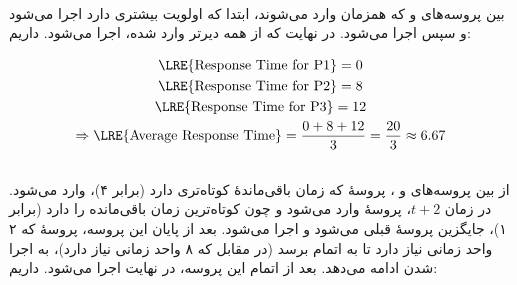 \documentclass{article}
\begin{document}
	\paragraph*{}
	بین پروسه‌های
	و
	که همزمان وارد می‌شوند، ابتدا
	که اولویت بیشتری دارد اجرا می‌شود و سپس
	اجرا می‌شود. در نهایت
	که از همه دیرتر وارد شده، اجرا می‌شود. داریم:

	\begin{gather*}
		\textrm{\LRE{Response Time for P1}} = 0 \\
		\textrm{\LRE{Response Time for P2}} = 8 \\
		\textrm{\LRE{Response Time for P3}} = 12 \\
		\Rightarrow
		\textrm{\LRE{Average Response Time}} =
		\frac{0 + 8 + 12}{3} = \frac{20}{3} \approx 6.67
	\end{gather*}

	\subsection*{}

	\begin{latin}
	\end{latin}

	\paragraph*{}
	از بین پروسه‌های
	و
	،
	پروسهٔ
	که زمان باقی‌مانده‌ٔ کوتاه‌تری دارد (برابر ۴)، وارد می‌شود. در زمان
	$t + 2$،
	پروسهٔ
	وارد می‌شود و چون کوتاه‌ترین زمان باقی‌مانده را دارد (برابر ۱)، جایگزین پروسهٔ قبلی می‌شود و اجرا می‌شود. بعد از پایان این پروسه، پروسهٔ
	که ۲ واحد زمانی نیاز دارد تا به اتمام برسد (در مقابل
	که ۸ واحد زمانی نیاز دارد)، به اجرا شدن ادامه می‌دهد. بعد از اتمام این پروسه،
	در نهایت اجرا می‌شود. داریم:
\end{document}
